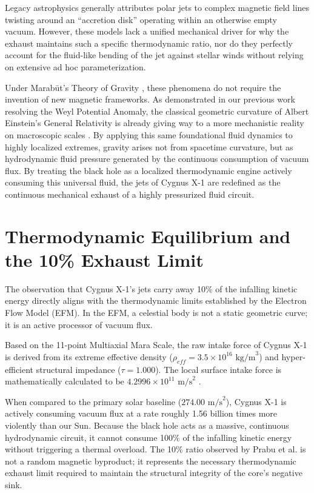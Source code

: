 \documentclass[11pt, a4paper]{article}
\begin{document}
Legacy astrophysics generally attributes polar jets to complex magnetic field lines twisting around an ``accretion disk'' operating within an otherwise empty vacuum. However, these models lack a unified mechanical driver for why the exhaust maintains such a specific thermodynamic ratio, nor do they perfectly account for the fluid-like bending of the jet against stellar winds without relying on extensive ad hoc parameterization.

\clearpage
Under Marab\={u}t's Theory of Gravity \cite{marabut2026m1}, these phenomena do not require the invention of new magnetic frameworks. As demonstrated in our previous work resolving the Weyl Potential Anomaly, the classical geometric curvature of Albert Einstein's General Relativity is already giving way to a more mechanistic reality on macroscopic scales \cite{marabut2026m2}. By applying this same foundational fluid dynamics to highly localized extremes, gravity arises not from spacetime curvature, but as hydrodynamic fluid pressure generated by the continuous consumption of vacuum flux. By treating the black hole as a localized thermodynamic engine actively consuming this universal fluid, the jets of Cygnus X-1 are redefined as the continuous mechanical exhaust of a highly pressurized fluid circuit.

\section{Thermodynamic Equilibrium and the 10\% Exhaust Limit}
The observation that Cygnus X-1's jets carry away 10\% of the infalling kinetic energy directly aligns with the thermodynamic limits established by the Electron Flow Model (EFM). In the EFM, a celestial body is not a static geometric curve; it is an active processor of vacuum flux.

Based on the 11-point Multiaxial Mara Scale, the raw intake force of Cygnus X-1 is derived from its extreme effective density ($\rho_{eff} = 3.5 \times 10^{16} \text{ kg/m}^3$) and hyper-efficient structural impedance ($\tau = 1.000$). The local surface intake force is mathematically calculated to be $4.2996 \times 10^{11} \text{ m/s}^2$ \cite{marabut2026m1}. 

When compared to the primary solar baseline ($274.00 \text{ m/s}^2$), Cygnus X-1 is actively consuming vacuum flux at a rate roughly 1.56 billion times more violently than our Sun. Because the black hole acts as a massive, continuous hydrodynamic circuit, it cannot consume 100\% of the infalling kinetic energy without triggering a thermal overload. The 10\% ratio observed by Prabu et al. is not a random magnetic byproduct; it represents the necessary thermodynamic exhaust limit required to maintain the structural integrity of the core's negative sink.
\end{document}
